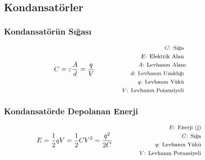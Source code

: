\subsection{Kondansatörler}

\subsubsection*{Kondansatörün Sığası}
\begin{equation}
    C = \varepsilon \frac{A}{d} = \frac{q}{V} \qquad \qquad \parbox{4cm}{\footnotesize$\begin{aligned}
        C\text{: Sığa } \\
        E\text{: Elektrik Alan } \\
        A\text{: Levhanın Alanı} \\
        d\text{: Levhanın Uzaklığı } \\
        q\text{: Levhanın Yükü } \\
        V\text{: Levhanın Potansiyeli }
\end{aligned}$}
\end{equation}

\subsubsection*{Kondansatörde Depolanan Enerji}
\begin{equation}
    E  = \frac{1}{2} qV = \frac{1}{2} C V^2 = \frac{q^2}{2C} \qquad \qquad \parbox{4cm}{\footnotesize$\begin{aligned}
        E\text{: Enerji (j) } \\
        C\text{: Sığa } \\
        q\text{: Levhanın Yükü } \\
        V\text{: Levhanın Potansiyeli }
\end{aligned}$}
\end{equation}

